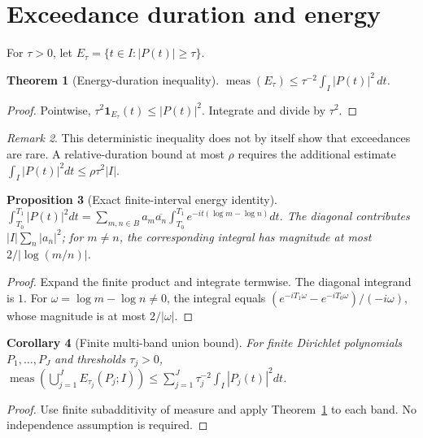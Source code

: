 \documentclass[11pt]{article}
\newtheorem{theorem}{Theorem}[section]
\newtheorem{corollary}[theorem]{Corollary}
\newtheorem{proposition}[theorem]{Proposition}
\theoremstyle{definition}\newtheorem{definition}[theorem]{Definition}
\theoremstyle{remark}\newtheorem{remark}[theorem]{Remark}
\begin{document}
\section{Exceedance duration and energy}
For $\tau>0$, let $E_\tau=\{t\in I:|P(t)|\ge\tau\}$.
\begin{theorem}[Energy-duration inequality]\label{duration}
$\operatorname{meas}(E_\tau)\le\tau^{-2}\int_I|P(t)|^2\,dt$.
\end{theorem}
\begin{proof}Pointwise, $\tau^2\mathbf 1_{E_\tau}(t)\le |P(t)|^2$. Integrate and divide by $\tau^2$.\end{proof}
\begin{remark}This deterministic inequality does not by itself show that exceedances are rare. A relative-duration bound at most $\rho$ requires the additional estimate $\int_I|P(t)|^2dt\le\rho\tau^2|I|$.\end{remark}
\begin{proposition}[Exact finite-interval energy identity]
$\int_{T_0}^{T_1}|P(t)|^2dt=\sum_{m,n\in B}a_m\overline{a_n}\int_{T_0}^{T_1}e^{-it(\log m-\log n)}dt$. The diagonal contributes $|I|\sum_n|a_n|^2$; for $m\ne n$, the corresponding integral has magnitude at most $2/|\log(m/n)|$.
\end{proposition}
\begin{proof}Expand the finite product and integrate termwise. The diagonal integrand is $1$. For $\omega=\log m-\log n\ne0$, the integral equals $(e^{-iT_1\omega}-e^{-iT_0\omega})/(-i\omega)$, whose magnitude is at most $2/|\omega|$.\end{proof}
\begin{corollary}[Finite multi-band union bound]
For finite Dirichlet polynomials $P_1,\ldots,P_J$ and thresholds $\tau_j>0$, $\operatorname{meas}(\bigcup_{j=1}^J E_{\tau_j}(P_j;I))\le\sum_{j=1}^J\tau_j^{-2}\int_I|P_j(t)|^2dt$.
\end{corollary}
\begin{proof}Use finite subadditivity of measure and apply Theorem~\ref{duration} to each band. No independence assumption is required.\end{proof}
\end{document}
